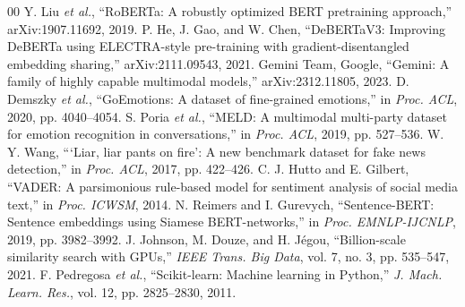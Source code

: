 \documentclass[conference]{IEEEtran}
\begin{document}
\begin{thebibliography}{00}
 Y. Liu \textit{et al.}, ``RoBERTa: A robustly optimized BERT pretraining approach,'' arXiv:1907.11692, 2019.
 P. He, J. Gao, and W. Chen, ``DeBERTaV3: Improving DeBERTa using ELECTRA-style pre-training with gradient-disentangled embedding sharing,'' arXiv:2111.09543, 2021.
 Gemini Team, Google, ``Gemini: A family of highly capable multimodal models,'' arXiv:2312.11805, 2023.
 D. Demszky \textit{et al.}, ``GoEmotions: A dataset of fine-grained emotions,'' in \textit{Proc. ACL}, 2020, pp. 4040--4054.
 S. Poria \textit{et al.}, ``MELD: A multimodal multi-party dataset for emotion recognition in conversations,'' in \textit{Proc. ACL}, 2019, pp. 527--536.
 W. Y. Wang, ```Liar, liar pants on fire': A new benchmark dataset for fake news detection,'' in \textit{Proc. ACL}, 2017, pp. 422--426.
 C. J. Hutto and E. Gilbert, ``VADER: A parsimonious rule-based model for sentiment analysis of social media text,'' in \textit{Proc. ICWSM}, 2014.
 N. Reimers and I. Gurevych, ``Sentence-BERT: Sentence embeddings using Siamese BERT-networks,'' in \textit{Proc. EMNLP-IJCNLP}, 2019, pp. 3982--3992.
 J. Johnson, M. Douze, and H. J\'egou, ``Billion-scale similarity search with GPUs,'' \textit{IEEE Trans. Big Data}, vol. 7, no. 3, pp. 535--547, 2021.
 F. Pedregosa \textit{et al.}, ``Scikit-learn: Machine learning in Python,'' \textit{J. Mach. Learn. Res.}, vol. 12, pp. 2825--2830, 2011.
\end{thebibliography}
\end{document}
